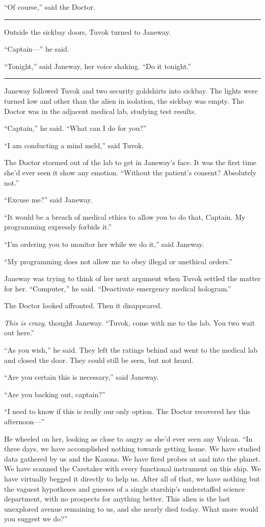 \documentclass[twoside,letterpaper,12pt]{memoir}
\begin{document}
``Of course,'' said the Doctor. 

\fancybreak{\rule{3cm}{0.4 pt}} 

Outside the sickbay doors, Tuvok turned to Janeway. 

``Captain---'' he said. 

``Tonight,'' said Janeway, her voice shaking. ``Do it tonight.'' 

\fancybreak{\rule{3cm}{0.4 pt}} 

Janeway followed Tuvok and two security goldshirts into sickbay. The lights were turned low and other than the alien in isolation, the sickbay was empty. The Doctor was in the adjacent medical lab, studying test results. 

``Captain,'' he said. ``What can I do for you?'' 

``I am conducting a mind meld,'' said Tuvok. 

The Doctor stormed out of the lab to get in Janeway's face. It was the first time she'd ever seen it show any emotion. ``Without the patient's consent? Absolutely not.'' 

``Excuse me?'' said Janeway. 

``It would be a breach of medical ethics to allow you to do that, Captain. My programming expressly forbids it.'' 

``I'm ordering you to monitor her while we do it,'' said Janeway. 

``My programming does not allow me to obey illegal or unethical orders.'' 

Janeway was trying to think of her next argument when Tuvok settled the matter for her. ``Computer,'' he said. ``Deactivate emergency medical hologram.'' 

The Doctor looked affronted. Then it disappeared. 

\textit{This is crazy}, thought Janeway. ``Tuvok, come with me to the lab. You two wait out here.'' 

``As you wish,'' he said. They left the ratings behind and went to the medical lab and closed the door. They could still be seen, but not heard. 

``Are you certain this is necessary,'' said Janeway. 

``Are you backing out, captain?'' 

``I need to know if this is really our only option. The Doctor recovered her this afternoon---'' 

He wheeled on her, looking as close to angry as she'd ever seen any Vulcan. ``In three days, we have accomplished nothing towards getting home. We have studied data gathered by us and the Kazons. We have fired probes at and into the planet. We have scanned the Caretaker with every functional instrument on this ship. We have virtually begged it directly to help us. After all of that, we have nothing but the vaguest hypotheses and guesses of a single starship's understaffed science department, with no prospects for anything better. This alien is the last unexplored avenue remaining to us, and she nearly died today. What more would you suggest we do?'' 
\end{document}
